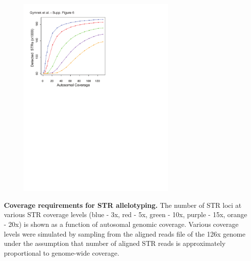 \begin{figure}[h!]
\centering
\label{fig:lobsup6}
\includegraphics[width=0.7\textwidth]{Figures/Chapter2/SuppFig6.pdf}
\end{figure}
\textbf{Coverage requirements for STR allelotyping.} The number of STR loci at various STR coverage levels (blue - 3x, red - 5x, green - 10x, purple - 15x, orange - 20x) is shown as a function of autosomal genomic coverage. Various coverage levels were simulated by sampling from the aligned reads file of the 126x genome under the assumption that number of aligned STR reads is approximately proportional to genome-wide coverage.

\pagebreak
